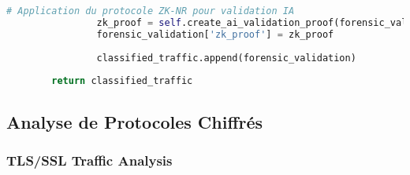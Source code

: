 \begin{lstlisting}[language=Python, caption=Système de capture PCAP avec validation d'intégrité]
                # Application du protocole ZK-NR pour validation IA
                zk_proof = self.create_ai_validation_proof(forensic_validation)
                forensic_validation['zk_proof'] = zk_proof
                
                classified_traffic.append(forensic_validation)
                
        return classified_traffic
\end{lstlisting}

\subsection{Analyse de Protocoles Chiffrés}

\subsubsection{TLS/SSL Traffic Analysis}

